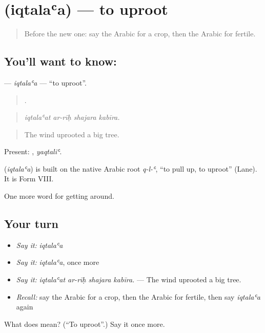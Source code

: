 \section[\texorpdfstring{\ar{اقتلع} (iqtalaʿa)}{اقتلع (iqtalaʿa)}]{ (iqtalaʿa) — to uproot}

\label{lesson:AR-C469-iqtalaa}



\begin{quote}
Before the new one: say the Arabic for a crop, then the Arabic for fertile.
\end{quote}

\subsection*{You'll want to know: }
\textbf{} — \emph{iqtalaʿa} — \textquotedblleft{}to uproot\textquotedblright{}.

\begin{quote}
   .
\end{quote}

\begin{quote}
\emph{iqtalaʿat ar-rīḥ shajara kabīra.}
\end{quote}

\begin{quote}
The wind uprooted a big tree.
\end{quote}

Present: , \emph{yaqtaliʿ}.

\begin{cousinweb}
\textbf{} (\emph{iqtalaʿa}) is built on the native Arabic root \emph{q-l-ʿ}, \textquotedblleft{}to pull up, to uproot\textquotedblright{} (Lane). It is Form VIII.
\end{cousinweb}

\begin{grammarlens}[title={What you've built}]
One more word for getting around.
\end{grammarlens}

\subsection*{Your turn}
\begin{itemize}
\raggedright
  \item \emph{Say it:} \emph{iqtalaʿa}
  \item \emph{Say it:} \emph{iqtalaʿa}, once more
  \item \emph{Say it:} \emph{iqtalaʿat ar-rīḥ shajara kabīra.} — The wind uprooted a big tree.
  \item \emph{Recall:} say the Arabic for a crop, then the Arabic for fertile, then say \emph{iqtalaʿa} again
\end{itemize}

\begin{tcolorbox}[breakable,colback=teal!4,colframe=teal!35!black,title={Before you move on}]
What does  mean? (\textquotedblleft{}To uproot\textquotedblright{}.) Say it once more.
\end{tcolorbox}
